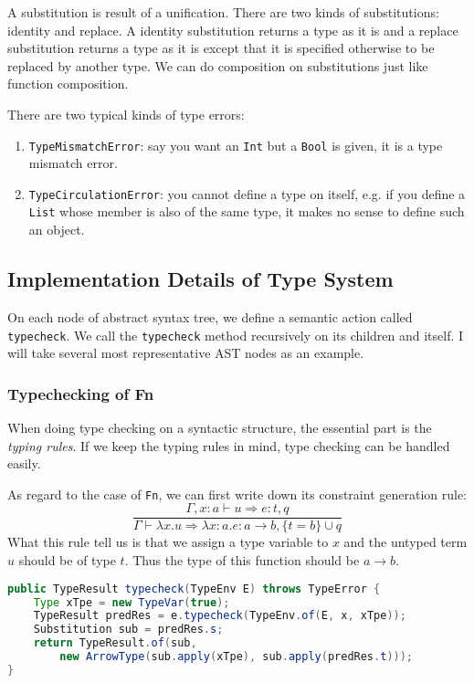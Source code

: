 \documentclass{article}
\begin{document}
A substitution is result of a unification. There are two kinds of substitutions: identity and replace. A identity substitution returns a type as it is and a replace substitution returns a type as it is except that it is specified otherwise to be replaced by another type. We can do composition on substitutions just like function composition.

There are two typical kinds of type errors:
\begin{enumerate}
	\item \verb|TypeMismatchError|: say you want an \verb|Int| but a \verb|Bool| is given, it is a type mismatch error.
	\item \verb|TypeCirculationError|: you cannot define a type on itself, e.g. if you define a \verb|List| whose member is also of the same type, it makes no sense to define such an object.
\end{enumerate}


\subsection{Implementation Details of Type System}
On each node of abstract syntax tree, we define a semantic action called \verb|typecheck|. We call the \verb|typecheck| method recursively on its children and itself. I will take several most representative AST nodes as an example.
\subsubsection{Typechecking of Fn}
When doing type checking on a syntactic structure, the essential part is the \emph{typing rules}. If we keep the typing rules in mind, type checking can be handled easily.

As regard to the case of \verb|Fn|, we can first write down its constraint generation rule:
\[
\frac{\Gamma, x:a \vdash u \Rightarrow e:t, q}{\Gamma \vdash \lambda x.u \Rightarrow \lambda x:a.e: a\rightarrow b, \{t = b\}\cup q}
\]
What this rule tell us is that we assign a type variable to $x$ and the untyped term $u$ should be of type $t$. Thus the type of this function should be $a\rightarrow b$.
\begin{lstlisting}[language=Java, caption=Type Checking of Fn]
public TypeResult typecheck(TypeEnv E) throws TypeError {
	Type xTpe = new TypeVar(true);
	TypeResult predRes = e.typecheck(TypeEnv.of(E, x, xTpe));
	Substitution sub = predRes.s;
	return TypeResult.of(sub,
		new ArrowType(sub.apply(xTpe), sub.apply(predRes.t)));
}
\end{lstlisting}
\end{document}
